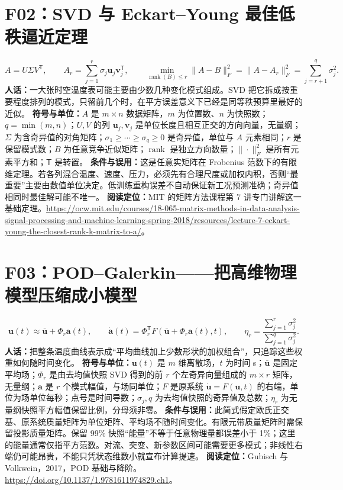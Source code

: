 \section{F02：SVD 与 Eckart--Young 最佳低秩逼近定理}
\begin{equation}
 A=U\Sigma V^{\mathsf T},\qquad
 A_r=\sum_{j=1}^{r}\sigma_j\mathbf u_j\mathbf v_j^{\mathsf T},\qquad
 \min_{\operatorname{rank}(B)\le r}\|A-B\|_F^2
 =\|A-A_r\|_F^2=\sum_{j=r+1}^{q}\sigma_j^2.
\end{equation}
\textbf{人话：}一大张时空温度表可能主要由少数几种变化模式组成。SVD 把它拆成按重要程度排列的模式，只留前几个时，在平方误差意义下已经是同等秩预算里最好的近似。
\textbf{符号与单位：}$A$ 是 $m\times n$ 数据矩阵，$m$ 为位置数、$n$ 为快照数；$q=\min(m,n)$；$U,V$ 的列 $\mathbf u_j,\mathbf v_j$ 是单位长度且相互正交的方向向量，无量纲；$\Sigma$ 为含奇异值的对角矩阵；$\sigma_1\ge\cdots\ge\sigma_q\ge0$ 是奇异值，单位与 $A$ 元素相同；$r$ 是保留模式数；$B$ 为任意竞争近似矩阵；$\operatorname{rank}$ 是独立方向数量；$\|\cdot\|_F^2$ 是所有元素平方和；$\mathsf T$ 是转置。
\textbf{条件与误用：}这是任意实矩阵在 Frobenius 范数下的有限维定理。若各列混合温度、速度、压力，必须先有合理尺度或加权内积，否则“最重要”主要由数值单位决定。低训练重构误差不自动保证新工况预测准确；奇异值相同时最佳解可能不唯一。
\textbf{阅读定位：}MIT 的矩阵方法课程第 7 讲专门讲解这一基础定理。\url{https://ocw.mit.edu/courses/18-065-matrix-methods-in-data-analysis-signal-processing-and-machine-learning-spring-2018/resources/lecture-7-eckart-young-the-closest-rank-k-matrix-to-a/}。

\section{F03：POD--Galerkin——把高维物理模型压缩成小模型}
\begin{equation}
 \mathbf u(t)\approx\bar{\mathbf u}+\Phi_r\mathbf a(t),\qquad
 \dot{\mathbf a}(t)=\Phi_r^{\mathsf T}F(\bar{\mathbf u}+\Phi_r\mathbf a(t),t),\qquad
 \eta_r=\frac{\sum_{j=1}^{r}\sigma_j^2}{\sum_{j=1}^{q}\sigma_j^2}.
\end{equation}
\textbf{人话：}把整条温度曲线表示成“平均曲线加上少数形状的加权组合”，只追踪这些权重如何随时间变化。
\textbf{符号与单位：}$\mathbf u(t)$ 是 $m$ 维离散场，$t$ 为时间 s；$\bar{\mathbf u}$ 是固定平均场；$\Phi_r$ 是由去均值快照 SVD 得到的前 $r$ 个左奇异向量组成的 $m\times r$ 矩阵，无量纲；$\mathbf a$ 是 $r$ 个模式幅值，与场同单位；$F$ 是原系统 $\dot{\mathbf u}=F(\mathbf u,t)$ 的右端，单位为场单位每秒；点号是时间导数；$\sigma_j,q$ 为去均值快照的奇异值及总数；$\eta_r$ 为无量纲快照平方幅值保留比例，分母须非零。
\textbf{条件与误用：}此简式假定欧氏正交基、原系统质量矩阵为单位矩阵、平均场不随时间变化。有限元带质量矩阵时需保留投影质量矩阵。保留 99\% 快照“能量”不等于任意物理量都误差小于 1\%；这里的能量通常仅指平方范数。对流、突变、新参数区间可能需要更多模式；非线性右端仍可能昂贵，不能只凭状态维数小就宣布计算提速。
\textbf{阅读定位：}Gubisch 与 Volkwein，2017，POD 基础与降阶。\url{https://doi.org/10.1137/1.9781611974829.ch1}。

